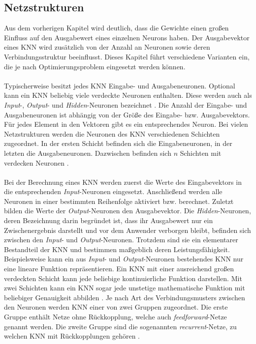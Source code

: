 \subsection{Netzstrukturen}
\label{subsec:network_structures}
Aus dem vorherigen Kapitel wird deutlich, dass die Gewichte einen großen Einfluss auf den Ausgabewert eines einzelnen Neurons haben. Der Ausgabevektor eines \ac{KNN} wird zusätzlich von der Anzahl an Neuronen sowie deren Verbindungsstruktur beeinflusst. Dieses Kapitel führt verschiedene Varianten ein, die je nach Optimierungsproblem eingesetzt werden können. 
\\\\
Typischerweise besitzt jedes \ac{KNN} Eingabe- und Ausgabeneuronen. Optional kann ein \ac{KNN} beliebig viele verdeckte Neuronen enthalten. Diese werden auch als \emph{Input}-, \emph{Output}- und \emph{Hidden}-Neuronen bezeichnet \cite{zell2003simulation}. Die Anzahl der Eingabe- und Ausgabeneuronen ist abhängig von der Größe des Eingabe- bzw. Ausgabevektors. Für jedes Element in den Vektoren gibt es ein entsprechendes Neuron.
Bei vielen Netzstrukturen werden die Neuronen des \ac{KNN} verschiedenen Schichten zugeordnet. In der ersten Schicht befinden sich die Eingabeneuronen, in der letzten die Ausgabeneuronen. Dazwischen befinden sich $n$ Schichten mit verdecken Neuronen \cite{zell2003simulation}. 
\\\\
Bei der Berechnung eines \ac{KNN} werden zuerst die Werte des Eingabevektors in die entsprechenden \emph{Input}-Neuronen eingesetzt. Anschließend werden alle Neuronen in einer bestimmten Reihenfolge aktiviert bzw. berechnet. Zuletzt bilden die Werte der \emph{Output}-Neuronen den Ausgabevektor. Die \emph{Hidden}-Neuronen, deren Bezeichnung darin begründet ist, dass ihr Ausgabewert nur ein Zwischenergebnis darstellt und vor dem Anwender verborgen bleibt, befinden sich zwischen den \emph{Input}- und \emph{Output}-Neuronen. Trotzdem sind sie ein elementarer Bestandteil der \ac{KNN} und bestimmen maßgeblich deren Leistungsfähigkeit. Beispielsweise kann ein aus \emph{Input}- und \emph{Output}-Neuronen bestehendes \ac{KNN} nur eine lineare Funktion repräsentieren. Ein \ac{KNN} mit einer ausreichend großen verdeckten Schicht kann jede beliebige kontinuierliche Funktion darstellen. Mit zwei Schichten kann ein \ac{KNN} sogar jede unstetige mathematische Funktion mit beliebiger Genauigkeit abbilden \cite{russell2013kunstliche}. Je nach Art des Verbindungsmusters zwischen den Neuronen werden \ac{KNN} einer von zwei Gruppen zugeordnet. Die erste Gruppe enthält Netze ohne Rückkopplung, welche auch \emph{feedforward}-Netze genannt werden. Die zweite Gruppe sind die sogenannten \emph{recurrent}-Netze, zu welchen \ac{KNN} mit Rückkopplungen gehören \cite{zell2003simulation}.


